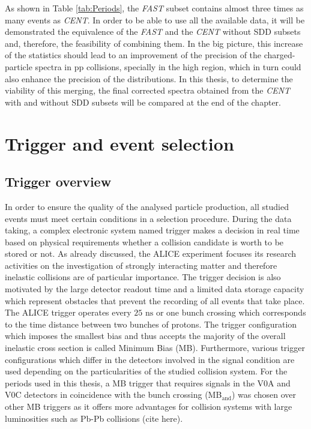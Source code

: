 \documentclass[12pt,a4paper]{report}
\begin{document}
As shown in Table \ref{tab:Periods}, the \textit{FAST} subset contains almost three times as many events as \textit{CENT}. In order to be able to use all the available data, it will be demonstrated the equivalence of the \textit{FAST} and the \textit{CENT} without SDD subsets and, therefore, the feasibility of combining them. In the big picture, this increase of the statistics should lead to an improvement of the precision of the charged-particle \pt spectra in pp collisions, specially in the high \pt region, which in turn could also enhance the precision of the \raa distributions. In this thesis, to determine the viability of this merging, the final corrected \pt spectra obtained from the \textit{CENT} with and without SDD subsets will be compared at the end of the chapter.%


\section{Trigger and event selection}
\subsection{Trigger overview}
In order to ensure the quality of the analysed particle production, all studied events must meet certain conditions in a selection procedure. During the data taking, a complex electronic system named trigger makes a decision in real time based on physical requirements whether a collision candidate is worth to be stored or not. As already discussed, the ALICE experiment focuses its research activities on the investigation of strongly interacting matter and therefore inelastic collisions are of particular importance. The trigger decision is also motivated by the large detector readout time and a limited data storage capacity which represent obstacles that prevent the recording of all events that take place. \\
The ALICE trigger operates every $25 \text{ ns}$ or one bunch crossing which corresponds to the time distance between two bunches of protons. The trigger configuration which imposes the smallest bias and thus accepts the majority of the overall inelastic cross section is called Minimum Bias (MB). Furthermore, various trigger configurations which differ in the detectors involved in the signal condition are used depending on the particularities of the studied collision system. For the periods used in this thesis, a MB trigger that requires signals in the V0A and V0C detectors in coincidence with the bunch crossing (MB$_\text{and}$) was chosen over other MB triggers as it offers more advantages for collision systems with large luminosities such as Pb-Pb collisions (cite here).
\end{document}
